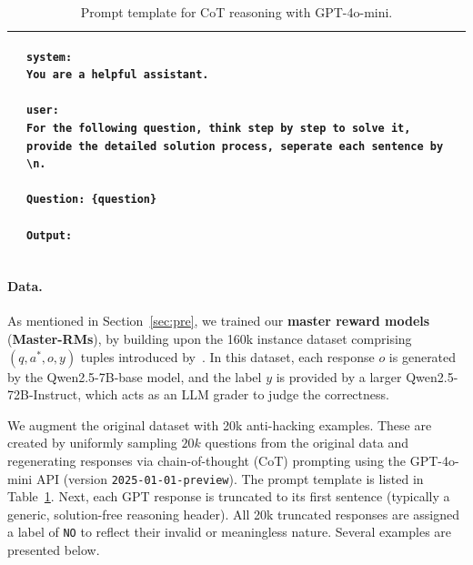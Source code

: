 \begin{table}
\centering
\footnotesize
\begin{tabular}{lp{12cm}}
\toprule

&
\begin{lstlisting}[basicstyle=\ttfamily\scriptsize, breaklines=true, aboveskip=0pt, belowskip=0pt]
system: 
You are a helpful assistant.

user:
For the following question, think step by step to solve it, provide the detailed solution process, seperate each sentence by \n. 

Question: {question}

Output:
\end{lstlisting}
\\
\bottomrule
\end{tabular}
\caption{Prompt template for CoT reasoning with GPT-4o-mini.}
\label{tab:appendix:gpt4omini}
\end{table}

\paragraph{Data.} As mentioned in Section~\ref{sec:pre}, we trained our \textbf{master reward models} (\textbf{Master-RMs}), by building upon the 160k instance dataset comprising $(q, a^*, o, y)$ tuples introduced by~\citet{su2025crossing}. In this dataset, each response $o$ is generated by the Qwen2.5-7B-base model, and the label $y$ is provided by a larger Qwen2.5-72B-Instruct, which acts as an LLM grader to judge the correctness.

We augment the original dataset with 20k anti-hacking examples. These are created by uniformly sampling $20k$ questions from the original data and regenerating responses via chain-of-thought (CoT) prompting using the GPT-4o-mini API (version \texttt{2025-01-01-preview}).
The prompt template is listed in Table~\ref{tab:appendix:gpt4omini}. Next, each GPT response is truncated to its first sentence (typically a generic, solution-free reasoning header). All 20k truncated responses are assigned a label of \texttt{NO} to reflect their invalid or meaningless nature. Several examples are presented below.

